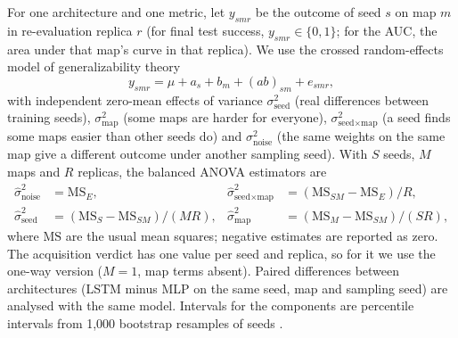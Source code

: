 For one architecture and one metric, let $y_{smr}$ be the outcome of seed $s$ on map $m$ in
re-evaluation replica $r$ (for final test success, $y_{smr}\in\{0,1\}$; for the AUC, the area
under that map's curve in that replica). We use the crossed random-effects model of
generalizability theory \citep{cronbach1972dependability,brennan2001generalizability}
\begin{equation}
  y_{smr} = \mu + a_s + b_m + (ab)_{sm} + e_{smr},
  \label{eq:model}
\end{equation}
with independent zero-mean effects of variance $\sigma^2_{\text{seed}}$ (real differences between
training seeds), $\sigma^2_{\text{map}}$ (some maps are harder for everyone),
$\sigma^2_{\text{seed}\times\text{map}}$ (a seed finds some maps easier than other seeds do) and
$\sigma^2_{\text{noise}}$ (the same weights on the same map give a different outcome under another
sampling seed). With $S$ seeds, $M$ maps and $R$ replicas, the balanced ANOVA estimators
\citep{searle1992variance} are
\begin{align*}
  \hat\sigma^2_{\text{noise}} &= \mathrm{MS}_E, &
  \hat\sigma^2_{\text{seed}\times\text{map}} &= (\mathrm{MS}_{SM}-\mathrm{MS}_E)/R,\\
  \hat\sigma^2_{\text{seed}} &= (\mathrm{MS}_S-\mathrm{MS}_{SM})/(MR), &
  \hat\sigma^2_{\text{map}} &= (\mathrm{MS}_M-\mathrm{MS}_{SM})/(SR),
\end{align*}
where $\mathrm{MS}$ are the usual mean squares; negative estimates are reported as zero. The
acquisition verdict has one value per seed and replica, so for it we use the one-way version
($M=1$, map terms absent). Paired differences between architectures (LSTM minus MLP on the same
seed, map and sampling seed) are analysed with the same model. Intervals for the components are
percentile intervals from 1,000 bootstrap resamples of seeds \citep{efron1993bootstrap}.

